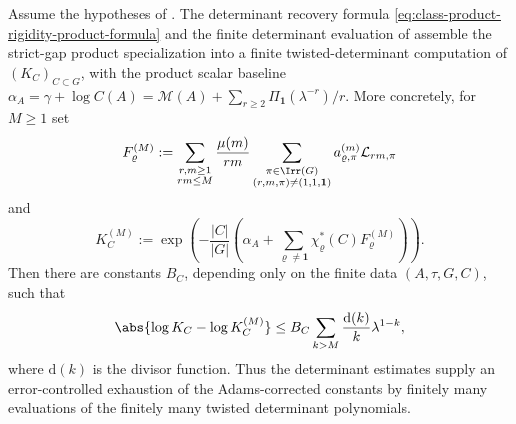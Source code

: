 \begin{proposition}
  \label{cor:assembled-adams-frobenius-product-formula}
  \label{cor:assembled-adams-frobenius-product-package}
  \label{prop:computational-finite-determinant-truncation}
  Assume the hypotheses of .  The determinant
  recovery formula \eqref{eq:class-product-rigidity-product-formula} and the
  finite determinant evaluation of
   assemble the strict-gap product
  specialization into a
  finite twisted-determinant computation of \((K_C)_{C\subset G}\), with the
  product scalar baseline
  \(\alpha_A=\gamma+\log C(A)
  =\mathcal M(A)+\sum_{r\ge2}\Pi_{\mathbf1}(\lambda^{-r})/r\).  More
  concretely, for
  \(M\ge1\) set
  \begin{equation}\label{eq:class-product-finite-truncation-coordinate}
    F^{(M)}_\varrho
    :=
    \sum_{\substack{r,m\ge1\\rm\le M}}
      \frac{\mu(m)}{rm}
      \sum_{\substack{\pi\in\Irr(G)\\(r,m,\pi)\neq(1,1,\mathbf1)}}
        a_{\varrho,\pi}^{(m)}
        \mathcal L_{rm,\pi}
  \end{equation}
  and
  \begin{equation}\label{eq:class-product-finite-truncation-constant}
    K_C^{(M)}
    :=
    \exp\!\left(
      -\frac{|C|}{|G|}
      \left(
        \alpha_A+
        \sum_{\varrho\ne\mathbf1}\chi_\varrho^\ast(C)F^{(M)}_\varrho
      \right)
    \right).
  \end{equation}
  Then there are constants \(B_C\), depending only on the finite data
  \((A,\tau,G,C)\), such that
  \begin{equation}\label{eq:class-product-finite-truncation-error}
    \abs{\log K_C-\log K_C^{(M)}}
    \le
    B_C
    \sum_{k>M}\frac{\mathrm d(k)}{k}\lambda^{1-k},
  \end{equation}
  where \(\mathrm d(k)\) is the divisor function.  Thus the determinant
  estimates supply an error-controlled exhaustion of the Adams-corrected
  constants by finitely many evaluations of the finitely many twisted
  determinant polynomials.
\end{proposition}


